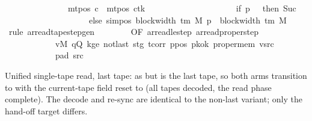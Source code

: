 \begin{isabellebody}
\ \ \ \ \ \ \ \ \ \ \ \ \ \ {\isasymand}\ mt{\isacharunderscore}{\kern0pt}pos\ c{\isacharprime}{\kern0pt}{\isacharprime}{\kern0pt}\ {\isacharequal}{\kern0pt}\ {\isacharparenleft}{\kern0pt}mt{\isacharunderscore}{\kern0pt}pos\ c{\isacharprime}{\kern0pt}{\isacharparenright}{\kern0pt}{\isacharparenleft}{\kern0pt}tk\ {\isacharcolon}{\kern0pt}{\isacharequal}{\kern0pt}\isanewline
\ \ \ \ \ \ \ \ \ \ \ \ \ \ \ \ \ \ \ \ if\ p\ {\isacharequal}{\kern0pt}\ {}\ then\ Suc\ {}\isanewline
\ \ \ \ \ \ \ \ \ \ \ \ \ \ \ \ \ \ \ \ else\ sim{\isacharunderscore}{\kern0pt}pos\ {\isacharparenleft}{\kern0pt}block{\isacharunderscore}{\kern0pt}width\ {\isacharparenleft}{\kern0pt}{\isasymGamma}{\isacharunderscore}{\kern0pt}tm\ M{\isacharparenright}{\kern0pt}{\isacharparenright}{\kern0pt}\ p\ {\isacharplus}{\kern0pt}\ block{\isacharunderscore}{\kern0pt}width\ {\isacharparenleft}{\kern0pt}{\isasymGamma}{\isacharunderscore}{\kern0pt}tm\ M{\isacharparenright}{\kern0pt}{\isacharparenright}{\kern0pt}{\isachardoublequoteclose}\isanewline
%
\isadelimproof
\ \ %
\endisadelimproof
%
\isatagproof
{}\isamarkupfalse%
\ {\isacharparenleft}{\kern0pt}rule\ ar{\isacharunderscore}{\kern0pt}read{\isacharunderscore}{\kern0pt}tape{\isacharunderscore}{\kern0pt}step{\isacharunderscore}{\kern0pt}gen\isanewline
\ \ \ \ \ \ \ \ {\isacharbrackleft}{\kern0pt}OF\ ar{\isacharunderscore}{\kern0pt}read{\isacharunderscore}{\kern0pt}le{\isacharunderscore}{\kern0pt}step\ ar{\isacharunderscore}{\kern0pt}read{\isacharunderscore}{\kern0pt}proper{\isacharunderscore}{\kern0pt}step\isanewline
\ \ \ \ \ \ \ \ \ \ \ \ vM\ qQ\ kge{}\ notlast\ stg\ tcorr\ ppos\ pkok\ proper{\isacharunderscore}{\kern0pt}mem\ vsrc\isanewline
\ \ \ \ \ \ \ \ \ \ \ \ pad{}\ src{}{\isacharbrackright}{\kern0pt}{\isacharparenright}{\kern0pt}%
\endisatagproof
{\isafoldproof}%
%
\isadelimproof
%
\endisadelimproof
%
\begin{isamarkuptext}%
Unified single-tape read, last tape: as 
  but  is the last tape, so both arms transition to
   with the current-tape field reset to
   (all tapes decoded, the read phase complete).  The
   decode and  re-sync are identical to the
  non-last variant; only the hand-off target differs.%
\end{isamarkuptext}\isamarkuptrue%

\end{isabellebody}
